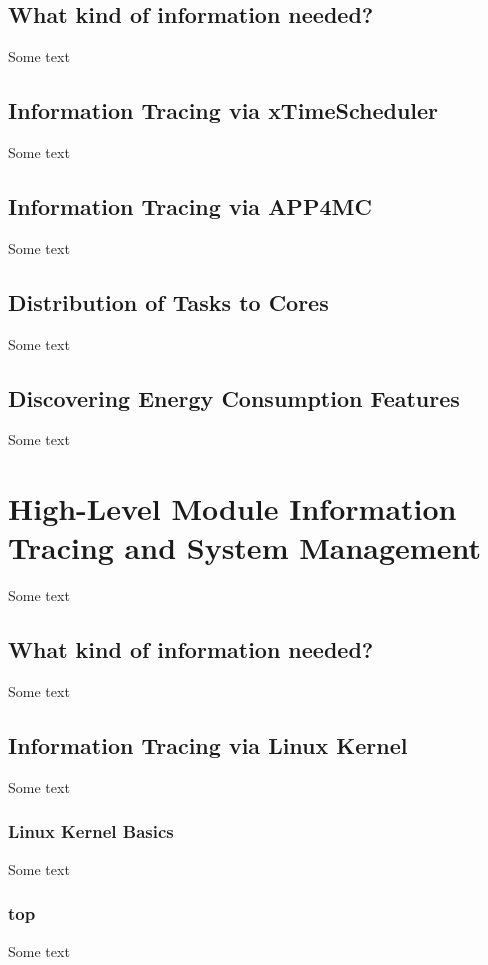 \subsection{What kind of information needed?}
Some text \\
\subsection{Information Tracing via xTimeScheduler}
Some text \\
\subsection{Information Tracing via APP4MC}
Some text \\
\subsection{Distribution of Tasks to Cores}
Some text \\
\subsection{Discovering Energy Consumption Features}
Some text \\
\section{High-Level Module Information Tracing and System Management}
Some text \\
\subsection{What kind of information needed?}
Some text \\
\subsection{Information Tracing via Linux Kernel}
Some text \\
\subsubsection{Linux Kernel Basics} %
Some text \\
\subsubsection{top} %
Some text \\
